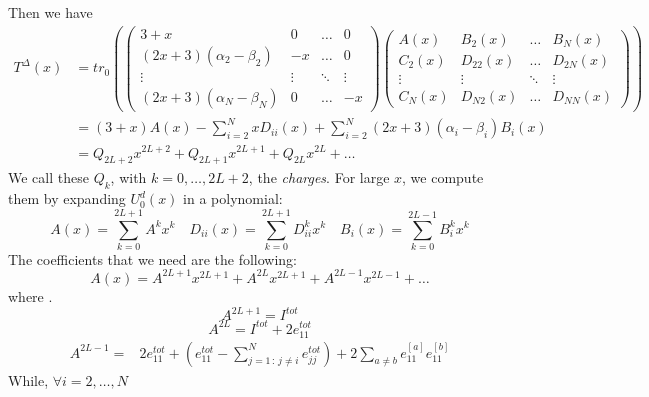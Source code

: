 \documentclass[11pt]{article}
\numberwithin{equation}{section}
\begin{document}
Then we have
\begin{equation}
	\begin{split}
	T^{\Delta}(x)&=tr_{0}\left(\begin{pmatrix}
		3+x&0&\ldots&0\\
		(2x+3)(\alpha_{2}-\beta_{2})&-x&\ldots&0\\
		\vdots&\vdots&\ddots&\vdots\\
		(2x+3)(\alpha_{N}-\beta_{N})&0&\ldots&-x
	\end{pmatrix}\begin{pmatrix}
	A(x)&B_{2}(x)&\ldots&B_{N}(x)\\
	C_{2}(x)&D_{22}(x)&\ldots&D_{2N}(x)\\
	\vdots&\vdots&\ddots&\vdots\\
	C_{N}(x)&D_{N2}(x)&\ldots&D_{NN}(x)
\end{pmatrix}\right)\\&=
(3+x)A(x)-\sum_{i=2}^{N}xD_{ii}(x)+\sum_{i=2}^{N}(2x+3)(\alpha_{i}-\beta_{i})B_{i}(x)\\&=
Q_{2L+2}x^{2L+2}+Q_{2L+1}x^{2L+1}+Q_{2L}x^{2L}+\ldots
\end{split}
\end{equation}
We call these $Q_{k}$, with $k=0,\ldots,2L+2$, the \textit{charges}. For large $x$, we compute them by expanding $U_{0}^{d}(x)$ in a polynomial: 
\begin{equation}
	A(x)=\sum_{k=0}^{2L+1}A^{k}x^{k}\quad D_{ii}(x)=\sum_{k=0}^{2L+1}D_{ii}^{k}x^{k}\quad B_{i}(x)=\sum_{k=0}^{2L-1}B_{i}^{k}x^{k}
\end{equation}
The coefficients that we need are the following:
\begin{equation}
	A(x)=A^{2L+1}x^{2L+1}+A^{2L}x^{2L+1}+A^{2L-1}x^{2L-1}+\ldots
\end{equation}
where .
\begin{equation}
	A^{2L+1}=I^{tot}
\end{equation}
\begin{equation}
	A^{2L}=I^{tot}+2e_{11}^{tot}
\end{equation}
\begin{equation}
	\begin{split}
		A^{2L-1}=&2e_{11}^{tot}+\left(e_{11}^{tot}-\sum_{j=1\,:\,j\neq i}^{N}e_{jj}^{tot}\right)+2\sum_{a\neq b}e_{11}^{[a]}e_{11}^{[b]}
	\end{split}
\end{equation}
While, $\forall i=2,\ldots,N$
\end{document}
